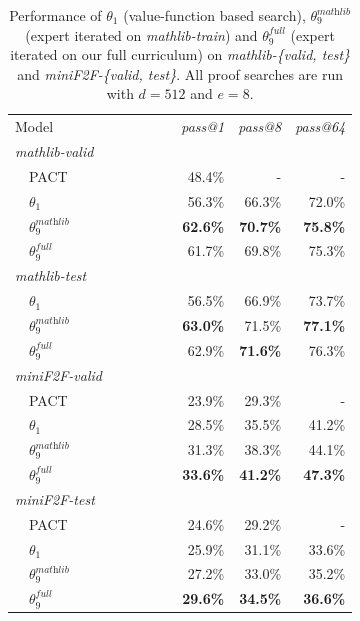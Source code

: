 \documentclass[nohyperref]{article}
\theoremstyle{plain}
\theoremstyle{definition}
\theoremstyle{remark}
\begin{document}
\begin{table}[ht]
\caption{Performance of $\theta_1$ (value-function based search), $\theta_9^{\textit{mathlib}}$ (expert iterated on \textit{mathlib-train}) and $\theta_9^{\textit{full}}$ (expert iterated on our full curriculum) on \textit{mathlib-\{valid, test\}} and \textit{miniF2F-\{valid,  test\}}. All proof searches are run with $d=512$ and $e=8$.}
\label{fig:final-results}
\begin{center}
\begin{small}
\begin{tabular}{lrrr}
\toprule
Model & \textit{pass@1} & \textit{pass@8} & \textit{pass@64} \\
\cmidrule(r){1-4}
\multicolumn{4}{l}{\textit{mathlib-valid}} \\
~~PACT~\cite{han2021proof} & 48.4\% & - & - \\
~~$\theta_1$~~~~~~~~~~~~~~~~~~ & 56.3\% & 66.3\% & 72.0\% \\  
~~$\theta_9^{\textit{mathlib}}$ & {\bf 62.6\%} & {\bf 70.7\%} & {\bf 75.8\%} \\  
~~$\theta_9^{\textit{full}}$ & 61.7\% & 69.8\% & 75.3\% \\  
\multicolumn{4}{l}{\textit{mathlib-test}} \\
~~$\theta_1$ & 56.5\% & 66.9\% & 73.7\% \\  
~~$\theta_9^{\textit{mathlib}}$ & {\bf 63.0\%} & 71.5\% & {\bf 77.1\%} \\  
~~$\theta_9^{\textit{full}}$ & 62.9\% & {\bf 71.6\%} & 76.3\% \\  
\cmidrule(r){1-4}
\multicolumn{4}{l}{\textit{miniF2F-valid}} \\
~~PACT~\cite{zheng2021minif2f} & 23.9\% & 29.3\% & -\\
~~$\theta_1$ & 28.5\% & 35.5\% & 41.2\% \\  
~~$\theta_9^{\textit{mathlib}}$ & 31.3\% & 38.3\% & 44.1\% \\  
~~$\theta_9^{\textit{full}}$ & {\bf 33.6\%} & {\bf 41.2\%} & {\bf 47.3\%} \\  
\multicolumn{4}{l}{\textit{miniF2F-test}} \\
~~PACT~\cite{zheng2021minif2f} & 24.6\% & 29.2\% & -\\
~~$\theta_1$ & 25.9\% & 31.1\% & 33.6\% \\  
~~$\theta_9^{\textit{mathlib}}$ & 27.2\% & 33.0\% & 35.2\% \\  
~~$\theta_9^{\textit{full}}$ & {\bf 29.6\%} & {\bf 34.5\%} & {\bf 36.6\%} \\  
\bottomrule
\end{tabular}
\end{small}
\end{center}
\end{table}
\end{document}
